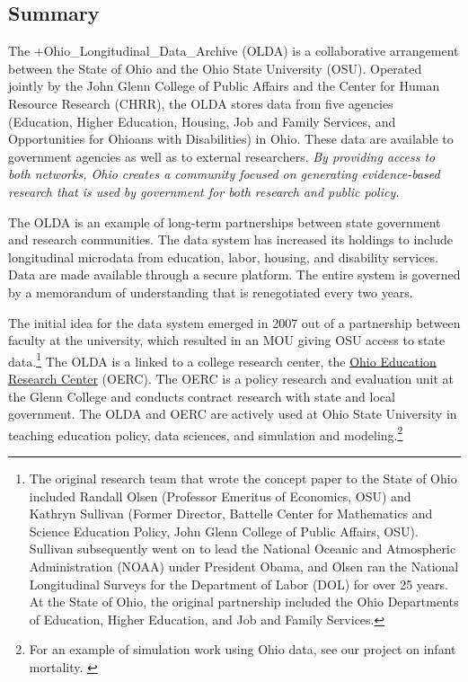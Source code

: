 \documentclass[
]{WileySix}
\begin{document}
\hypertarget{summary-2}{%
\subsection{Summary}\label{summary-2}}

The +Ohio\_Longitudinal\_Data\_Archive\textbar{} (OLDA) is a collaborative arrangement between the State of Ohio and the Ohio State University (OSU). Operated jointly by the John Glenn College of Public Affairs and the Center for Human Resource Research (CHRR), the OLDA stores data from five agencies (Education, Higher Education, Housing, Job and Family Services, and Opportunities for Ohioans with Disabilities) in Ohio. These data are available to government agencies as well as to external researchers. \emph{By providing access to both networks, Ohio creates a community focused on generating evidence-based research that is {used} by government for both research and public policy.}

The OLDA is an example of long-term partnerships between state government and research communities. The data system has increased its holdings to include longitudinal microdata from education, labor, housing, and disability services. Data are made available through a secure platform. The entire system is governed by a memorandum of understanding that is renegotiated every two years.

The initial idea for the data system emerged in 2007 out of a partnership between faculty at the university, which resulted in an MOU giving OSU access to state data.\footnote{The original research team that wrote the concept paper to the State of Ohio included Randall Olsen (Professor Emeritus of Economics, OSU) and Kathryn Sullivan (Former Director, Battelle Center for Mathematics and Science Education Policy, John Glenn College of Public Affairs, OSU). Sullivan subsequently went on to lead the National Oceanic and Atmospheric Administration (NOAA) under President Obama, and Olsen ran the National Longitudinal Surveys for the Department of Labor (DOL) for over 25 years. At the State of Ohio, the original partnership included the Ohio Departments of Education, Higher Education, and Job and Family Services.} The OLDA is a linked to a college research center, the \href{\%5Bwww.oerc.osu.edu\%5D(http://www.oerc.osu.edu/)}{Ohio Education Research Center} (OERC). The OERC is a policy research and evaluation unit at the Glenn College and conducts contract research with state and local government. The OLDA and OERC are actively used at Ohio State University in teaching education policy, data sciences, and simulation and modeling.\footnote{For an example of simulation work using Ohio data, see our project on infant mortality. \citep{hosseinichimeh2017}}
\end{document}
